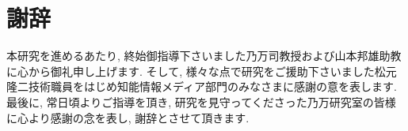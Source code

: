 \chapter*{謝辞}\label{chap:thank}
本研究を進めるあたり, 終始御指導下さいました乃万司教授および山本邦雄助教に心から御礼申し上げます. そして, 様々な点で研究をご援助下さいました松元隆二技術職員をはじめ知能情報メディア部門のみなさまに感謝の意を表します. 最後に, 常日頃よりご指導を頂き, 研究を見守ってくださった乃万研究室の皆様に心より感謝の念を表し, 謝辞とさせて頂きます.
